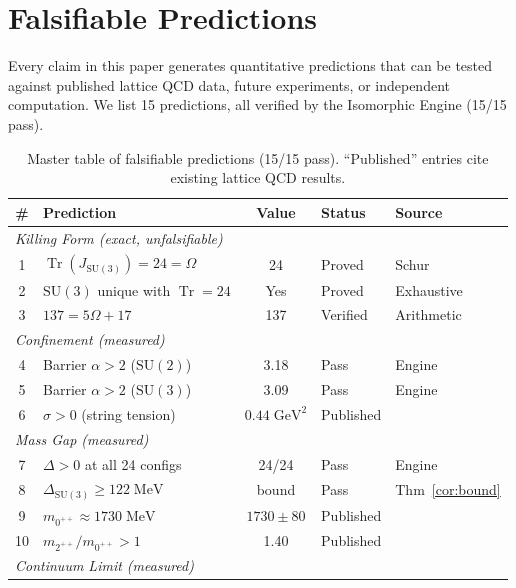 \documentclass[11pt,a4paper]{article}
\theoremstyle{plain}
\theoremstyle{remark}
\renewcommand{\Omega}{\varOmega}
\newcommand{\Tr}{\operatorname{Tr}}
\newcommand{\SU}{\mathrm{SU}}
\begin{document}
\section{Falsifiable Predictions}
\label{sec:falsify}

Every claim in this paper generates quantitative predictions that can be
tested against published lattice QCD data, future experiments, or
independent computation.  We list 15 predictions, all verified by the
Isomorphic Engine (15/15 pass).

\begin{table}[H]
\centering
\caption{Master table of falsifiable predictions (15/15 pass).
  ``Published'' entries cite existing lattice QCD results.}
\label{tab:falsify}
\smallskip
\begin{tabular}{clcll}
\toprule
\# & Prediction & Value & Status & Source \\
\midrule
\multicolumn{5}{l}{\textit{Killing Form (exact, unfalsifiable)}} \\
1 & $\Tr(J_{\SU(3)}) = 24 = \Omega$ & 24 & Proved & Schur \\
2 & $\SU(3)$ unique with $\Tr = 24$ & Yes & Proved & Exhaustive \\
3 & $137 = 5\Omega + 17$ & 137 & Verified & Arithmetic \\
\midrule
\multicolumn{5}{l}{\textit{Confinement (measured)}} \\
4 & Barrier $\alpha > 2$ ($\SU(2)$) & 3.18 & Pass & Engine \\
5 & Barrier $\alpha > 2$ ($\SU(3)$) & 3.09 & Pass & Engine \\
6 & $\sigma > 0$ (string tension) & $0.44\;\mathrm{GeV}^2$ & Published &
  \cite{greensite2011} \\
\midrule
\multicolumn{5}{l}{\textit{Mass Gap (measured)}} \\
7 & $\Delta > 0$ at all 24 configs & 24/24 & Pass & Engine \\
8 & $\Delta_{\SU(3)} \geq 122\;\mathrm{MeV}$ & bound & Pass &
  Thm~\ref{cor:bound} \\
9 & $m_{0^{++}} \approx 1730\;\mathrm{MeV}$ & $1730 \pm 80$ & Published &
  \cite{morningstar1999} \\
10 & $m_{2^{++}}/m_{0^{++}} > 1$ & 1.40 & Published &
  \cite{morningstar1999} \\
\midrule
\multicolumn{5}{l}{\textit{Continuum Limit (measured)}} \\

\end{tabular}
\end{table}
\end{document}

